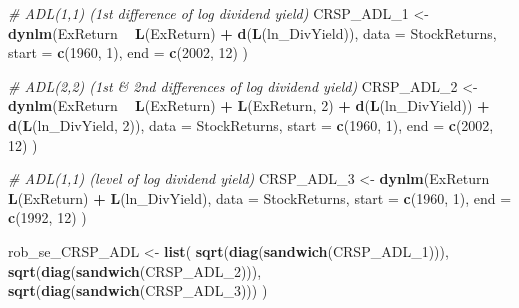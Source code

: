 \documentclass[]{book}
\newenvironment{Shaded}{\begin{snugshade}}{\end{snugshade}}
\newcommand{\KeywordTok}[1]{\textcolor[rgb]{0.13,0.29,0.53}{\textbf{#1}}}
\newcommand{\DataTypeTok}[1]{\textcolor[rgb]{0.13,0.29,0.53}{#1}}
\newcommand{\DecValTok}[1]{\textcolor[rgb]{0.00,0.00,0.81}{#1}}
\newcommand{\StringTok}[1]{\textcolor[rgb]{0.31,0.60,0.02}{#1}}
\newcommand{\CommentTok}[1]{\textcolor[rgb]{0.56,0.35,0.01}{\textit{#1}}}
\newcommand{\OperatorTok}[1]{\textcolor[rgb]{0.81,0.36,0.00}{\textbf{#1}}}
\newcommand{\NormalTok}[1]{#1}
\theoremstyle{definition}
\theoremstyle{definition}
\theoremstyle{definition}
\theoremstyle{remark}
\begin{document}
\begin{Shaded}
\begin{Highlighting}[]
\CommentTok{# ADL(1,1) (1st difference of log dividend yield)}
\NormalTok{CRSP_ADL_}\DecValTok{1}\NormalTok{ <-}\StringTok{ }\KeywordTok{dynlm}\NormalTok{(ExReturn }\OperatorTok{~}\StringTok{ }\KeywordTok{L}\NormalTok{(ExReturn) }\OperatorTok{+}\StringTok{ }\KeywordTok{d}\NormalTok{(}\KeywordTok{L}\NormalTok{(ln_DivYield)), }
                    \DataTypeTok{data =}\NormalTok{ StockReturns,}
                    \DataTypeTok{start =} \KeywordTok{c}\NormalTok{(}\DecValTok{1960}\NormalTok{, }\DecValTok{1}\NormalTok{), }\DataTypeTok{end =} \KeywordTok{c}\NormalTok{(}\DecValTok{2002}\NormalTok{, }\DecValTok{12}\NormalTok{)}
\NormalTok{              )}

\CommentTok{# ADL(2,2) (1st & 2nd differences of log dividend yield)}
\NormalTok{CRSP_ADL_}\DecValTok{2}\NormalTok{ <-}\StringTok{ }\KeywordTok{dynlm}\NormalTok{(ExReturn }\OperatorTok{~}\StringTok{ }\KeywordTok{L}\NormalTok{(ExReturn) }\OperatorTok{+}\StringTok{ }\KeywordTok{L}\NormalTok{(ExReturn, }\DecValTok{2}\NormalTok{) }\OperatorTok{+}\StringTok{ }\KeywordTok{d}\NormalTok{(}\KeywordTok{L}\NormalTok{(ln_DivYield)) }\OperatorTok{+}\StringTok{ }\KeywordTok{d}\NormalTok{(}\KeywordTok{L}\NormalTok{(ln_DivYield, }\DecValTok{2}\NormalTok{)), }
                   \DataTypeTok{data =}\NormalTok{ StockReturns,}
                   \DataTypeTok{start =} \KeywordTok{c}\NormalTok{(}\DecValTok{1960}\NormalTok{, }\DecValTok{1}\NormalTok{), }\DataTypeTok{end =} \KeywordTok{c}\NormalTok{(}\DecValTok{2002}\NormalTok{, }\DecValTok{12}\NormalTok{)}
\NormalTok{              )}

\CommentTok{# ADL(1,1) (level of log dividend yield)}
\NormalTok{CRSP_ADL_}\DecValTok{3}\NormalTok{ <-}\StringTok{ }\KeywordTok{dynlm}\NormalTok{(ExReturn }\OperatorTok{~}\StringTok{ }\KeywordTok{L}\NormalTok{(ExReturn) }\OperatorTok{+}\StringTok{ }\KeywordTok{L}\NormalTok{(ln_DivYield),}
                    \DataTypeTok{data =}\NormalTok{ StockReturns,}
                    \DataTypeTok{start =} \KeywordTok{c}\NormalTok{(}\DecValTok{1960}\NormalTok{, }\DecValTok{1}\NormalTok{), }\DataTypeTok{end =} \KeywordTok{c}\NormalTok{(}\DecValTok{1992}\NormalTok{, }\DecValTok{12}\NormalTok{)}
\NormalTok{              )}
\end{Highlighting}
\end{Shaded}

\begin{Shaded}
\begin{Highlighting}[]
\NormalTok{rob_se_CRSP_ADL <-}\StringTok{ }\KeywordTok{list}\NormalTok{(}
  \KeywordTok{sqrt}\NormalTok{(}\KeywordTok{diag}\NormalTok{(}\KeywordTok{sandwich}\NormalTok{(CRSP_ADL_}\DecValTok{1}\NormalTok{))),}
  \KeywordTok{sqrt}\NormalTok{(}\KeywordTok{diag}\NormalTok{(}\KeywordTok{sandwich}\NormalTok{(CRSP_ADL_}\DecValTok{2}\NormalTok{))),}
  \KeywordTok{sqrt}\NormalTok{(}\KeywordTok{diag}\NormalTok{(}\KeywordTok{sandwich}\NormalTok{(CRSP_ADL_}\DecValTok{3}\NormalTok{)))}
\NormalTok{)}
\end{Highlighting}
\end{Shaded}
\end{document}
